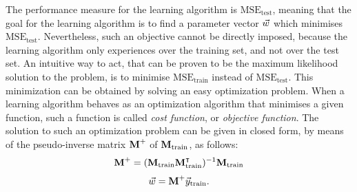 The performance measure for the learning algorithm is $\mathrm{MSE_{test}}$, meaning that the goal for the learning algorithm is to find a parameter vector $\vec{w}$ which minimises $\mathrm{MSE_{test}}$. Nevertheless, such an objective cannot be directly imposed, because the learning algorithm only experiences over the training set, and not over the test set. An intuitive way to act, that can be proven to be the maximum likelihood solution to the problem, is to minimise  $\mathrm{MSE_{train}}$ instead of $\mathrm{MSE_{test}}$. This minimization can be obtained by solving an easy optimization problem. When a learning algorithm behaves as an optimization algorithm that minimises a given function, such a function is called \emph{cost function}, or \emph{objective function}. 
The solution to such an optimization problem can be given in closed form, by means of the pseudo-inverse matrix $\textbf{M}^+$ of $\textbf{M}_{\text{train}}$, as follows:
\begin{equation}
\textbf{M}^+ = (\textbf{M}_{\text{train}}\textbf{M}_{\text{train}}^\intercal)^{-1}\textbf{M}_{\text{train}}
\end{equation}
\begin{equation}
\vec{w} = \textbf{M}^+\vec{y}_{\text{train}}.
\end{equation}

